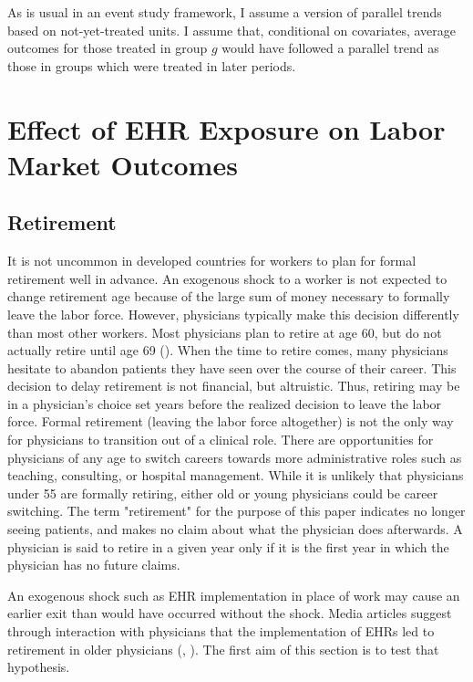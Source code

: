 \documentclass[11pt]{article}
\begin{document}
As is usual in an event study framework, I assume a version of parallel trends based on not-yet-treated units. I assume that, conditional on covariates, average outcomes for those treated in group $g$ would have followed a parallel trend as those in groups which were treated in later periods. 







\section{Effect of EHR Exposure on Labor Market Outcomes}

\subsection{Retirement}

It is not uncommon in developed countries for workers to plan for formal retirement well in advance. An exogenous shock to a worker is not expected to change retirement age because of the large sum of money necessary to formally leave the labor force. However, physicians typically make this decision differently than most other workers. Most physicians plan to retire at age 60, but do not actually retire until age 69 (\cite{collier2017challenges}). When the time to retire comes, many physicians hesitate to abandon patients they have seen over the course of their career. This decision to delay retirement is not financial, but altruistic. Thus, retiring may be in a physician's choice set years before the realized decision to leave the labor force. Formal retirement (leaving the labor force altogether) is not the only way for physicians to transition out of a clinical role. There are opportunities for physicians of any age to switch careers towards more administrative roles such as teaching, consulting, or hospital management. While it is unlikely that physicians under 55 are formally retiring, either old or young physicians could be career switching. The term "retirement" for the purpose of this paper indicates no longer seeing patients, and makes no claim about what the physician does afterwards. A physician is said to retire in a given year only if it is the first year in which the physician has no future claims.

An exogenous shock such as EHR implementation in place of work may cause an earlier exit than would have occurred without the shock. Media articles suggest through interaction with physicians that the implementation of EHRs led to retirement in older physicians (\cite{ringel_2019}, \cite{loria_2020}). The first aim of this section is to test that hypothesis. 
\end{document}
